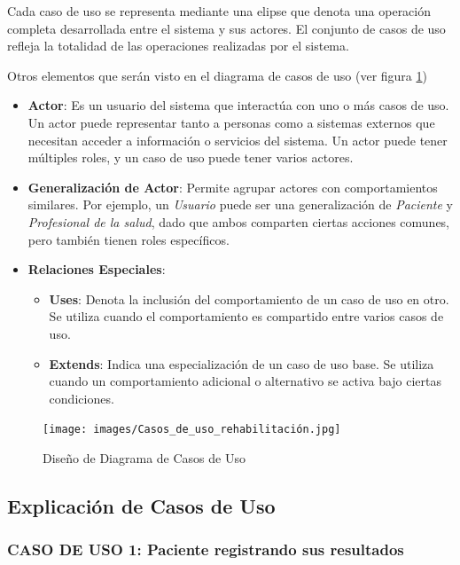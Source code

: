 \documentclass{article}
\begin{document}
Cada caso de uso se representa mediante una elipse que denota una operación completa desarrollada entre el sistema y sus actores. El conjunto de casos de uso refleja la totalidad de las operaciones realizadas por el sistema.

Otros elementos que serán visto en el diagrama de casos de uso (ver figura \ref{fig:requisitos_diagrama})

\begin{itemize}
	\item \textbf{Actor}: Es un usuario del sistema que interactúa con uno o más casos de uso. Un actor puede representar tanto a personas como a sistemas externos que necesitan acceder a información o servicios del sistema. Un actor puede tener múltiples roles, y un caso de uso puede tener varios actores.
	
	\item \textbf{Generalización de Actor}: Permite agrupar actores con comportamientos similares. Por ejemplo, un \textit{Usuario} puede ser una generalización de \textit{Paciente} y \textit{Profesional de la salud}, dado que ambos comparten ciertas acciones comunes, pero también tienen roles específicos.
	
	\item \textbf{Relaciones Especiales}:
	\begin{itemize}
		\item \textbf{Uses}: Denota la inclusión del comportamiento de un caso de uso en otro. Se utiliza cuando el comportamiento es compartido entre varios casos de uso.
		\item \textbf{Extends}: Indica una especialización de un caso de uso base. Se utiliza cuando un comportamiento adicional o alternativo se activa bajo ciertas condiciones.
	\end{itemize}
\end{itemize}

\begin{figure}[h!]
	\begin{center} 
		\texttt{[image: images/Casos\_de\_uso\_rehabilitación.jpg]}
		\caption{Diseño de Diagrama de Casos de Uso}
		\label{fig:requisitos_diagrama}
	\end{center}
\end{figure}

\subsection{Explicación de Casos de Uso}

\subsubsection*{CASO DE USO 1: Paciente registrando sus resultados}
\end{document}
